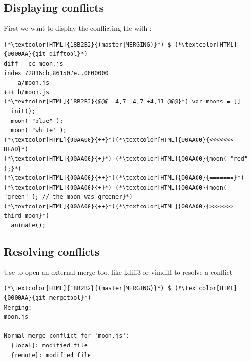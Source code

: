 \subsection{Displaying conflicts}
\begin{frame}[fragile]
  \subslidetitle

  First we want to display the conflicting file with :
  \begin{lstlisting}
(*\textcolor[HTML]{18B2B2}{(master|MERGING)}*) $ (*\textcolor[HTML]{0000AA}{git difftool}*)
diff --cc moon.js
index 72886cb,861507e..0000000
--- a/moon.js
+++ b/moon.js
(*\textcolor[HTML]{18B2B2}{@@@ -4,7 -4,7 +4,11 @@@}*) var moons = []
  init();
  moon( "blue" );
  moon( "white" );
(*\textcolor[HTML]{00AA00}{++}*)(*\textcolor[HTML]{00AA00}{<<<<<<< HEAD}*)
(*\textcolor[HTML]{00AA00}{+}*) (*\textcolor[HTML]{00AA00}{moon( "red" );}*)
(*\textcolor[HTML]{00AA00}{++}*)(*\textcolor[HTML]{00AA00}{=======}*)
(*\textcolor[HTML]{00AA00}{+}*) (*\textcolor[HTML]{00AA00}{moon( "green" ); // the moon was greener}*)
(*\textcolor[HTML]{00AA00}{++}*)(*\textcolor[HTML]{00AA00}{>>>>>>> third-moon}*)
  animate();
\end{lstlisting}
\end{frame}

\subsection{Resolving conflicts}
\begin{frame}[fragile]
  \subslidetitle
  Use  to open an external merge tool like kdiff3 or vimdiff to resolve a conflict:

  \begin{lstlisting}
(*\textcolor[HTML]{18B2B2}{(master|MERGING)}*) $ (*\textcolor[HTML]{0000AA}{git mergetool}*)
Merging:
moon.js

Normal merge conflict for 'moon.js':
  {local}: modified file
  {remote}: modified file
\end{lstlisting}

\end{frame}

